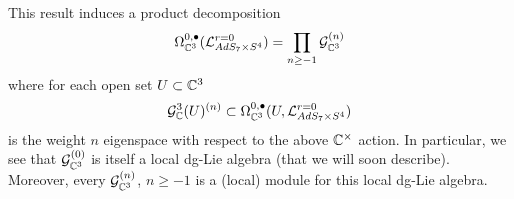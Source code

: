  
This result induces a product decomposition 
\begin{equation}
\label{eqn:Gdecomp}
\Omega^{0,\bullet}_{\mathbb{C}^3} (\mathcal{L}^{{r=0}}_{AdS_7\times S^4}) = \prod_{n \geq -1} \mathcal{G}_{\mathbb{C}^3}^{(n)}
\end{equation}
where for each open set $U \subset \mathbb{C}^3$
\[
\mathcal{G}_{\mathbb{C}}^3(U)^{(n)}\subset \Omega^{0,\bullet}_{\mathbb{C}^3} (U, \mathcal{L}^{{r=0}}_{AdS_7\times S^4} )
\]
is the weight $n$ eigenspace with respect to the above $\mathbb{C}^\times$ action.  In particular, we see that $\mathcal{G}^{(0)}_{\mathbb{C}^3}$ is itself a local dg-Lie algebra (that we will soon describe). 
Moreover, every $\mathcal{G}_{\mathbb{C}^3}^{(n)}$, $n \geq -1$ is a (local) module for this local dg-Lie algebra.


